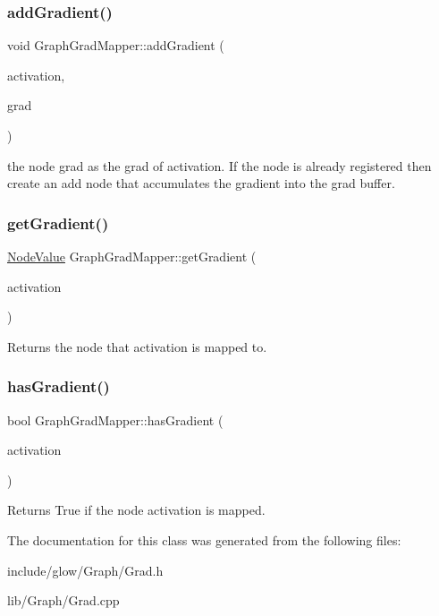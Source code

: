 \subsubsection{\texorpdfstring{add\+Gradient()}{addGradient()}}
{\footnotesize\ttfamily void Graph\+Grad\+Mapper\+::add\+Gradient (\begin{DoxyParamCaption}\item[{\hyperlink{structglow_1_1_node_value}{Node\+Value}}]{activation,  }\item[{\hyperlink{structglow_1_1_node_value}{Node\+Value}}]{grad }\end{DoxyParamCaption})}

the node {\ttfamily grad} as the grad of {\ttfamily activation}. If the node is already registered then create an \textquotesingle{}add\textquotesingle{} node that accumulates the gradient into the grad buffer. \mbox{\label{classglow_1_1_graph_grad_mapper_a6a14b27336f7054e326bbaa46b94edec}} 
\subsubsection{\texorpdfstring{get\+Gradient()}{getGradient()}}
{\footnotesize\ttfamily \hyperlink{structglow_1_1_node_value}{Node\+Value} Graph\+Grad\+Mapper\+::get\+Gradient (\begin{DoxyParamCaption}\item[{\hyperlink{structglow_1_1_node_value}{Node\+Value}}]{activation }\end{DoxyParamCaption})}

\begin{DoxyReturn}{Returns}
the node that {\ttfamily activation} is mapped to. 
\end{DoxyReturn}
\mbox{\label{classglow_1_1_graph_grad_mapper_a65988a9626ac25e16111a35c50b7d65e}} 
\subsubsection{\texorpdfstring{has\+Gradient()}{hasGradient()}}
{\footnotesize\ttfamily bool Graph\+Grad\+Mapper\+::has\+Gradient (\begin{DoxyParamCaption}\item[{\hyperlink{structglow_1_1_node_value}{Node\+Value}}]{activation }\end{DoxyParamCaption})}

\begin{DoxyReturn}{Returns}
True if the node {\ttfamily activation} is mapped. 
\end{DoxyReturn}


The documentation for this class was generated from the following files\+:\begin{DoxyCompactItemize}
\item 
include/glow/\+Graph/Grad.\+h\item 
lib/\+Graph/Grad.\+cpp\end{DoxyCompactItemize}
